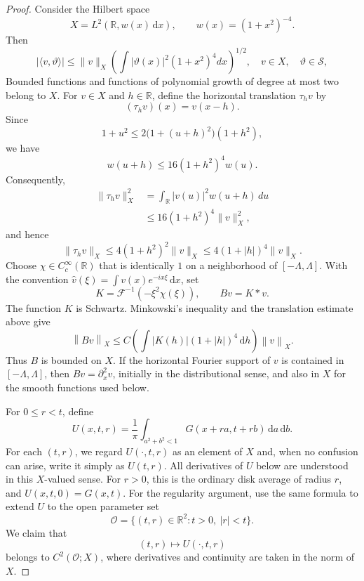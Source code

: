 \documentclass[12pt,a4paper]{article}
\theoremstyle{remark}
\newcommand{\dd}{\,\mathrm d}
\newcommand{\norm}[1]{\left\lVert#1\right\rVert}
\begin{document}
\begin{proof}
\medskip
Consider the Hilbert space
\[
X=L^2(\mathbb R,w(x)\dd x),\qquad w(x)=(1+x^2)^{-4}.
\]
Then
\[
|\langle v,\vartheta\rangle|
\le\|v\|_X\left(\int|\vartheta(x)|^2(1+x^2)^4dx\right)^{1/2}, \quad v \in X,
\quad\vartheta\in\mathcal S,
\]
Bounded functions and functions of polynomial growth of degree at most two belong to $X$.
For $v\in X$ and $h\in\mathbb R$, define the horizontal
translation $\tau_hv$ by
\[
(\tau_hv)(x)=v(x-h).
\]
Since
\[
1+u^2\le 2\bigl(1+(u+h)^2\bigr)(1+h^2),
\]
we have
\[
w(u+h)\le 16(1+h^2)^4w(u).
\]
Consequently,
\[
\begin{aligned}
\|\tau_hv\|_X^2
&=\int_{\mathbb R}|v(u)|^2w(u+h)\,du\\
&\le 16(1+h^2)^4\|v\|_X^2,
\end{aligned}
\]
and hence
\[
\|\tau_hv\|_X
\le 4(1+h^2)^2\|v\|_X
\le 4(1+|h|)^4\|v\|_X.
\]
Choose $\chi\in C_c^\infty(\mathbb R)$ that is identically $1$ on a neighborhood of $[-\Lambda,\Lambda]$.
With the convention $\widehat v(\xi)=\int v(x)e^{-ix\xi}\dd x$, set
\[
K=\mathcal F^{-1}(-\xi^2\chi(\xi)),\qquad Bv=K*v.
\]
The function $K$ is Schwartz. Minkowski's inequality and the translation estimate above give
\[
\norm{Bv}_X\le
C\left(\int|K(h)|(1+|h|)^4\dd h\right)\norm v_X.
\]
Thus $B$ is bounded on $X$. If the horizontal Fourier support of $v$ is contained in
$[-\Lambda,\Lambda]$, then $Bv=\partial_x^2v$, initially in the distributional sense,
and also in $X$ for the smooth functions used below. 

\medskip
For $0\le r<t$, define
\[
U(x,t,r)=\frac1\pi\int_{a^2+b^2<1}G(x+ra,t+rb)\dd a\dd b.
\]
For each $(t,r)$, we regard $U(\cdot,t,r)$ as an element of $X$ and,
when no confusion can arise, write it simply as $U(t,r)$. All derivatives of
$U$ below are understood in this $X$-valued sense.
For $r>0$, this is the ordinary disk average of radius $r$,
and $U(x,t,0)=G(x,t)$.
For the regularity argument, use the same formula to extend
$U$ to the open parameter set
\[
\mathcal O=\{(t,r)\in\mathbb R^2:t>0,\ |r|<t\}.
\]
We claim that
\[
(t,r)\longmapsto U(\cdot,t,r)
\]
belongs to $C^2(\mathcal O;X)$, where derivatives and continuity
are taken in the norm of $X$.


\end{proof}
\end{document}
